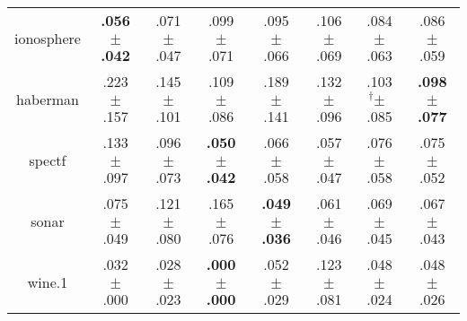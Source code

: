 \begin{tabular}{|c|ccccccc|}
ionosphere & \textbf{.056$^{\phantom{\dag}}\pm^{\phantom{\dag}}$.042}\cellcolor{green!40} & .071$^{\phantom{\dag}}\pm^{\phantom{\dag}}$.047\cellcolor{green!15} & .099$^{\phantom{\dag}}\pm^{\phantom{\dag}}$.071\cellcolor{red!27} & .095$^{\phantom{\dag}}\pm^{\phantom{\dag}}$.066\cellcolor{red!22} & .106$^{\phantom{\dag}}\pm^{\phantom{\dag}}$.069\cellcolor{red!40} & .084$^{\phantom{\dag}}\pm^{\phantom{\dag}}$.063\cellcolor{red!5} & .086$^{\phantom{\dag}}\pm^{\phantom{\dag}}$.059\cellcolor{red!7} \\
haberman & .223$^{\phantom{\dag}}\pm^{\phantom{\dag}}$.157\cellcolor{red!40} & .145$^{\phantom{\dag}}\pm^{\phantom{\dag}}$.101\cellcolor{green!9} & .109$^{\phantom{\dag}}\pm^{\phantom{\dag}}$.086\cellcolor{green!32} & .189$^{\phantom{\dag}}\pm^{\phantom{\dag}}$.141\cellcolor{red!18} & .132$^{\phantom{\dag}}\pm^{\phantom{\dag}}$.096\cellcolor{green!18} & .103$^{\dag}\pm^{\phantom{\dag}}$.085\cellcolor{green!36} & \textbf{.098$^{\phantom{\dag}}\pm^{\phantom{\dag}}$.077}\cellcolor{green!40} \\
spectf & .133$^{\phantom{\dag}}\pm^{\phantom{\dag}}$.097\cellcolor{red!40} & .096$^{\phantom{\dag}}\pm^{\phantom{\dag}}$.073\cellcolor{red!4} & \textbf{.050$^{\phantom{\dag}}\pm^{\phantom{\dag}}$.042}\cellcolor{green!40} & .066$^{\phantom{\dag}}\pm^{\phantom{\dag}}$.058\cellcolor{green!24} & .057$^{\phantom{\dag}}\pm^{\phantom{\dag}}$.047\cellcolor{green!33} & .076$^{\phantom{\dag}}\pm^{\phantom{\dag}}$.058\cellcolor{green!14} & .075$^{\phantom{\dag}}\pm^{\phantom{\dag}}$.052\cellcolor{green!15} \\
sonar & .075$^{\phantom{\dag}}\pm^{\phantom{\dag}}$.049\cellcolor{green!22} & .121$^{\phantom{\dag}}\pm^{\phantom{\dag}}$.080\cellcolor{red!9} & .165$^{\phantom{\dag}}\pm^{\phantom{\dag}}$.076\cellcolor{red!40} & \textbf{.049$^{\phantom{\dag}}\pm^{\phantom{\dag}}$.036}\cellcolor{green!40} & .061$^{\phantom{\dag}}\pm^{\phantom{\dag}}$.046\cellcolor{green!31} & .069$^{\phantom{\dag}}\pm^{\phantom{\dag}}$.045\cellcolor{green!26} & .067$^{\phantom{\dag}}\pm^{\phantom{\dag}}$.043\cellcolor{green!27} \\
wine.1 & .032$^{\phantom{\dag}}\pm^{\phantom{\dag}}$.000\cellcolor{green!19} & .028$^{\phantom{\dag}}\pm^{\phantom{\dag}}$.023\cellcolor{green!22} & \textbf{.000$^{\phantom{\dag}}\pm^{\phantom{\dag}}$.000}\cellcolor{green!40} & .052$^{\phantom{\dag}}\pm^{\phantom{\dag}}$.029\cellcolor{green!6} & .123$^{\phantom{\dag}}\pm^{\phantom{\dag}}$.081\cellcolor{red!40} & .048$^{\phantom{\dag}}\pm^{\phantom{\dag}}$.024\cellcolor{green!9} & .048$^{\phantom{\dag}}\pm^{\phantom{\dag}}$.026\cellcolor{green!8} \\

\end{tabular}
